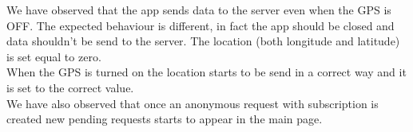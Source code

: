 We have observed that the app sends data to the server even when the GPS is OFF. The expected behaviour is different, in fact the app should be closed and data shouldn't be send to the server. The location (both longitude and latitude) is set equal to zero.\\
When the GPS is turned on the location starts to be send in a correct way and it is set to the correct value. \\
We have also observed that once an anonymous request with subscription is created new pending requests starts to appear in the main page.